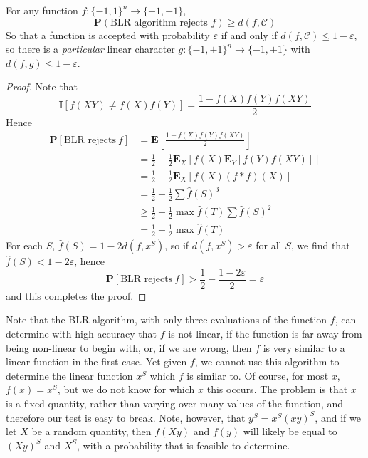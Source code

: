 \begin{theorem}
    For any function $f: \{ -1, 1 \}^n \to \{ -1, +1 \}$,
    \[ \mathbf{P}(\text{BLR algorithm rejects $f$}) \geq d(f, \mathcal{C}) \]
    So that a function is accepted with probability $\varepsilon$ if and only if $d(f,\mathcal{C}) \leq 1 - \varepsilon$, so there is a {\it particular} linear character $g: \{ -1, +1 \}^n \to \{ -1, +1 \}$ with $d(f,g) \leq 1 - \varepsilon$.
\end{theorem}
\begin{proof}
    Note that
    \[ \mathbf{I}[f(XY) \neq f(X)f(Y)] = \frac{1 - f(X)f(Y)f(XY)}{2} \]
    Hence
    \begin{align*}
        \mathbf{P}[\text{BLR rejects}\ f] &= \mathbf{E} \left[ \frac{1 - f(X)f(Y)f(XY)}{2} \right]\\
        &= \frac{1}{2} - \frac{1}{2} \mathbf{E}_X[f(X) \mathbf{E}_Y[f(Y) f(XY)]]\\
        &= \frac{1}{2} - \frac{1}{2} \mathbf{E}_X[f(X) (f * f)(X)]\\
        &= \frac{1}{2} - \frac{1}{2} \sum \widehat{f}(S)^3\\
        &\geq \frac{1}{2} - \frac{1}{2} \max \widehat{f}(T) \sum \widehat{f}(S)^2\\
        &= \frac{1}{2} - \frac{1}{2} \max \widehat{f}(T)
    \end{align*}
    For each $S$, $\widehat{f}(S) = 1 - 2 d(f, x^S)$, so if $d(f,x^S) > \varepsilon$ for all $S$, we find that $\widehat{f}(S) < 1 - 2 \varepsilon$, hence
    \[ \mathbf{P}[\text{BLR rejects}\ f] > \frac{1}{2} - \frac{1 - 2\varepsilon}{2} = \varepsilon \]
    and this completes the proof.
\end{proof}

Note that the BLR algorithm, with only three evaluations of the function $f$, can determine with high accuracy that $f$ is not linear, if the function is far away from being non-linear to begin with, or, if we are wrong, then $f$ is very similar to a linear function in the first case. Yet given $f$, we cannot use this algorithm to determine the linear function $x^S$ which $f$ is similar to. Of course, for most $x$, $f(x) = x^S$, but we do not know for which $x$ this occurs. The problem is that $x$ is a fixed quantity, rather than varying over many values of the function, and therefore our test is easy to break. Note, however, that $y^S = x^S (xy)^S$, and if we let $X$ be a random quantity, then $f(Xy)$ and $f(y)$ will likely be equal to $(Xy)^S$ and $X^S$, with a probability that is feasible to determine.

